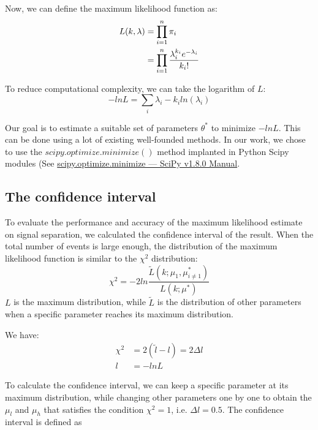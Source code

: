 \documentclass[10pt,a4paper,twocolumn,twoside,UTF8]{article}
\begin{document}
		Now, we can define the maximum likelihood function as:
		\begin{align}
			L(k,\lambda) &= \prod_{i=1}^n \pi_i \notag \\
						 &= \prod_{i=1}^n \frac{\lambda_i^{k_i}e^{-\lambda_i}}{k_i!}
			\label{eq:1.6}
		\end{align}

		To reduce computational complexity, we can take the logarithm of $L$: 
		\begin{equation}
			-lnL = \sum_{i} \lambda_i - k_i ln(\lambda_i)
 			\label{eq:1.7}
		\end{equation}

		Our goal is to estimate a suitable set of parameters $\theta^*$ to minimize $-lnL$. 
		This can be done using a lot of existing well-founded methods. 
		In our work, we chose to use the $scipy.optimize.minimize()$ method implanted in Python Scipy modules 
		(See \href{https://docs.scipy.org/doc/scipy-1.8.0/html-scipyorg/reference/generated/scipy.optimize.minimize.html}{scipy.optimize.minimize — SciPy v1.8.0 Manual}.

	\subsection{The confidence interval}
		To evaluate the performance and accuracy of the maximum likelihood estimate on signal separation, we calculated the confidence interval of the result. 
		When the total number of events is large enough, the distribution of the maximum likelihood function is similar to the $\chi^2$ distribution:
		\begin{equation}
			\chi^2 = -2ln\frac{\widetilde{L}(k;\mu_1,\mu_{i \neq 1}^*)}{L(k;\mu^*)}
			\label{eq:1.8}
		\end{equation}
		$L$ is the maximum distribution, while $\widetilde{L}$ is the distribution of other parameters when a specific parameter reaches its maximum distribution. 
		
		We have:
		\begin{align}
			\chi^2 &= 2(\widetilde{l}-l) = 2\Delta l \\
			l &= -lnL
			\label{eq:1.9}
		\end{align}

		To calculate the confidence interval, we can keep a specific parameter at its maximum distribution, 
		while changing other parameters one by one to obtain the $\mu_{l}$ and $\mu_h$ that satisfies the condition $\chi^2 = 1$, i.e. $\Delta l = 0.5$. 
		The confidence interval is defined as 
		\begin{equation}
			[\mu_{l}, \mu_{h}]
			\label{eq:1.10}
		\end{equation}	
		
\end{document}
